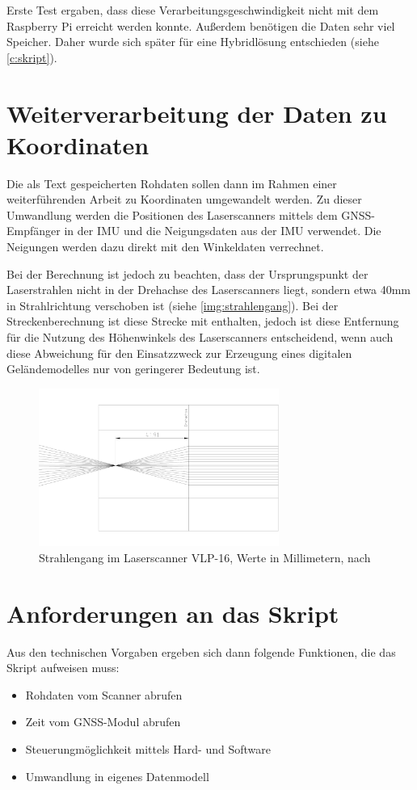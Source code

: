 \documentclass[a4paper,12pt,bibliography=totoc, listof=totoc,titlepage,pointlessnumbers]{scrreprt}
\begin{document}
Erste Test ergaben, dass diese Verarbeitungsgeschwindigkeit nicht mit dem Raspberry Pi erreicht werden konnte. Außerdem benötigen die Daten sehr viel Speicher. Daher wurde sich später für eine Hybridlösung entschieden (siehe \autoref{c:skript}).

\section{Weiterverarbeitung der Daten zu Koordinaten}
Die als Text gespeicherten Rohdaten sollen dann im Rahmen einer weiterführenden Arbeit zu Koordinaten umgewandelt werden. Zu dieser Umwandlung werden die Positionen des Laserscanners mittels dem GNSS-Empfänger in der IMU und die Neigungsdaten aus der IMU verwendet. Die Neigungen werden dazu direkt mit den Winkeldaten verrechnet.

Bei der Berechnung ist jedoch zu beachten, dass der Ursprungspunkt der Laserstrahlen nicht in der Drehachse des Laserscanners liegt, sondern etwa 40mm in Strahlrichtung verschoben ist (siehe \autoref{img:strahlengang}). Bei der Streckenberechnung ist diese Strecke mit enthalten, jedoch ist diese Entfernung für die Nutzung des Höhenwinkels des Laserscanners entscheidend, wenn auch diese Abweichung für den Einsatzzweck zur Erzeugung eines digitalen Geländemodelles nur von geringerer Bedeutung ist.

\begin{figure}[ht!]
 \centering
 \includegraphics[width=0.7\textwidth]{./img/Strahlengang.png}
 \caption{Strahlengang im Laserscanner VLP-16, Werte in Millimetern, nach 
\citet{vlpCAD}}
 \label{img:strahlengang}
\end{figure}

\section{Anforderungen an das Skript}
Aus den technischen Vorgaben ergeben sich dann folgende Funktionen, die das Skript aufweisen muss:
\begin{itemize}
 \item Rohdaten vom Scanner abrufen
 \item Zeit vom GNSS-Modul abrufen
 \item Steuerungmöglichkeit mittels Hard- und Software
 \item Umwandlung in eigenes Datenmodell
\end{itemize}
\end{document}
